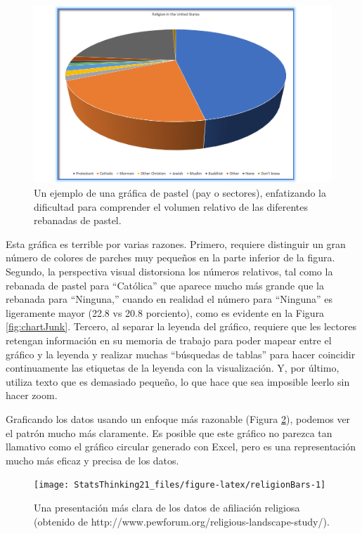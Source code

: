 \documentclass[
  12pt,
]{book}
\begin{document}
\begin{figure}
\includegraphics[width=14.11in,height=0.5\textheight]{images/religion_piechart} \caption{Un ejemplo de una gráfica de pastel (pay o sectores), enfatizando la dificultad para comprender el volumen relativo de las diferentes rebanadas de pastel.}\label{fig:pieChart}
\end{figure}

Esta gráfica es terrible por varias razones. Primero, requiere distinguir un gran número de colores de parches muy pequeños en la parte inferior de la figura. Segundo, la perspectiva visual distorsiona los números relativos, tal como la rebanada de pastel para ``Católica'' que aparece mucho más grande que la rebanada para ``Ninguna,'' cuando en realidad el número para ``Ninguna'' es ligeramente mayor (22.8 vs 20.8 porciento), como es evidente en la Figura \ref{fig:chartJunk}. Tercero, al separar la leyenda del gráfico, requiere que les lectores retengan información en su memoria de trabajo para poder mapear entre el gráfico y la leyenda y realizar muchas ``búsquedas de tablas'' para hacer coincidir continuamente las etiquetas de la leyenda con la visualización. Y, por último, utiliza texto que es demasiado pequeño, lo que hace que sea imposible leerlo sin hacer zoom.

Graficando los datos usando un enfoque más razonable (Figura \ref{fig:religionBars}), podemos ver el patrón mucho más claramente. Es posible que este gráfico no parezca tan llamativo como el gráfico circular generado con Excel, pero es una representación mucho más eficaz y precisa de los datos.

\begin{figure}
\texttt{[image: StatsThinking21\_files/figure-latex/religionBars-1]} \caption{Una presentación más clara de los datos de afiliación religiosa (obtenido de http://www.pewforum.org/religious-landscape-study/).}\label{fig:religionBars}
\end{figure}
\end{document}
